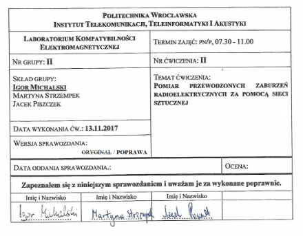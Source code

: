 \documentclass[12pt, a4paper, oneside]{article}
\begin{document}
\begin{figure}[h!]
\centering
\includegraphics[scale=.5]{title.png}
\end{figure}
\clearpage
{}
\end{document}
